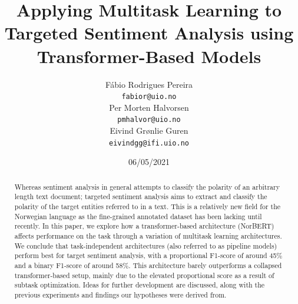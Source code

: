 \documentclass[11pt,a4paper]{article}
\title{Applying Multitask Learning to Targeted Sentiment Analysis using Transformer-Based Models}
\author{Fábio Rodrigues Pereira \\
  \texttt{fabior@uio.no} \\\And
  Per Morten Halvorsen \\
  \texttt{pmhalvor@uio.no} \\\And
  Eivind Grønlie Guren \\
  \texttt{eivindgg@ifi.uio.no} \\}
\date{06/05/2021}
\begin{document}
\maketitle
\begin{abstract}


Whereas sentiment analysis in general attempts to classify the polarity of an arbitrary length text document; targeted sentiment analysis aims to extract and classify the polarity of the target entities referred to in a text. This is a relatively new field for the Norwegian language as the fine-grained annotated dataset has been lacking until recently. In this paper, we explore how a transformer-based architecture (NorBERT) affects performance on the task through a variation of multitask learning architectures. 
We conclude that task-independent architectures (also referred to as pipeline models) perform best for target sentiment analysis, with a proportional F1-score of around 45\% and a binary F1-score of around 58\%. This architecture barely outperforms a collapsed transformer-based setup, mainly due to the elevated proportional score as a result of subtask optimization. Ideas for further development are discussed, along with the previous experiments and findings our hypotheses were derived from.  


\end{abstract}
\end{document}
